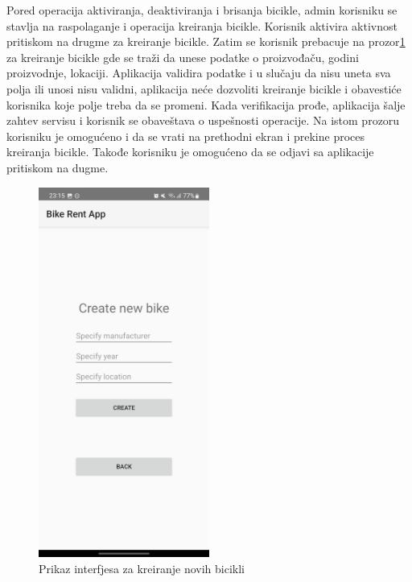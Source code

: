 \documentclass[12pt,oneside]{memoir}
\begin{document}
Pored operacija aktiviranja, deaktiviranja i brisanja bicikle, admin korisniku se stavlja na raspolaganje i operacija kreiranja bicikle. Korisnik aktivira aktivnost pritiskom na drugme za kreiranje bicikle. Zatim se korisnik prebacuje na prozor\ref{fig:kreiranjeNovihBicikli} za kreiranje bicikle gde se traži da unese podatke o proizvođaču, godini proizvodnje, lokaciji. Aplikacija validira podatke i u slučaju da nisu uneta sva polja ili unosi nisu validni, aplikacija neće dozvoliti kreiranje bicikle i obavestiće korisnika koje polje treba da se promeni. Kada verifikacija prođe, aplikacija šalje zahtev servisu i korisnik se obaveštava o uspešnosti operacije. Na istom prozoru korisniku je omogućeno i da se vrati na prethodni ekran i prekine proces kreiranja bicikle. Takođe korisniku je omogućeno da se odjavi sa aplikacije pritiskom na dugme.
 
\begin{figure}[!ht]
  \centering
  \includegraphics[width=0.5\textwidth]{Kreiranje nove bicikle.jpg}
  \caption{Prikaz interfjesa za kreiranje novih bicikli}
  \label{fig:kreiranjeNovihBicikli}
\end{figure}


\end{document}
